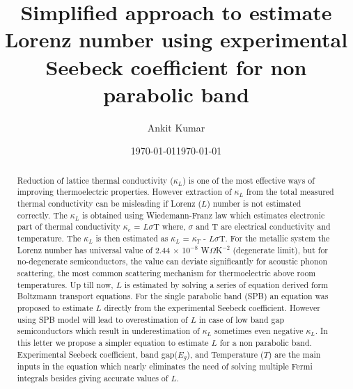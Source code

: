 \documentclass[%
 aip,
 amsmath,amssymb,
reprint, onecolumn %
]{revtex4-1}
\begin{document}

\title[]{Simplified approach to estimate Lorenz number using experimental Seebeck coefficient for non parabolic band}
\author{Ankit Kumar}
 \altaffiliation[]{}%
%

\date{\today}%

\begin{abstract}
Reduction of lattice thermal conductivity ($\kappa_L$) is one of the most effective ways of improving thermoelectric properties. However extraction of $\kappa_L$ from the total measured thermal conductivity can be misleading if Lorenz ($L$) number is not estimated correctly. The $\kappa_L$ is obtained using Wiedemann-Franz law which estimates electronic part of thermal conductivity $\kappa_e$ = $L$$\sigma$T where, $\sigma$ and T are electrical conductivity and temperature. The $\kappa_L$ is then estimated as $\kappa_L$ = $\kappa_T$ - $L$$\sigma$T. For the metallic system the Lorenz number has universal value of 2.44 $\times$ 10$^{-8}$ W$\Omega$K$^{-2}$ (degenerate limit), but for no-degenerate semiconductors, the value can deviate significantly for acoustic phonon scattering, the most common scattering mechanism for thermoelectric above room temperatures. Up till now, $L$ is estimated by solving a series of equation derived form Boltzmann transport equations. For the single parabolic band (SPB) an equation was proposed to estimate $L$ directly from the experimental Seebeck coefficient. However using SPB model will lead to overestimation of $L$ in case of low band gap semiconductors which result in underestimation of $\kappa_L$ sometimes even negative $\kappa_L$. In this letter we propose a simpler equation to estimate $L$ for a non parabolic band. Experimental Seebeck coefficient, band gap($E_g$), and Temperature ($T$) are the main inputs in the equation which nearly eliminates the need of solving multiple Fermi integrals besides giving accurate values of $L$. 
\end{abstract}



\date{\today}


\draft %
\maketitle %
\end{document}
